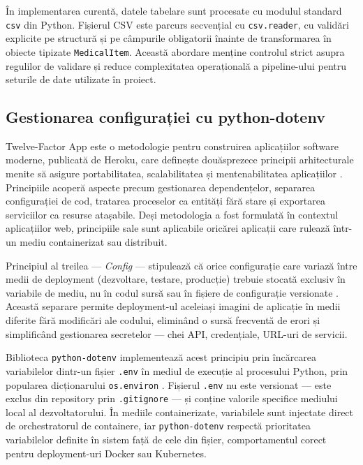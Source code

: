 \documentclass[12pt, a4paper, oneside, romanian]{teza-upb}
\begin{document}
În implementarea curentă, datele tabelare sunt procesate cu modulul standard
\texttt{csv} din Python. Fișierul CSV este parcurs secvențial cu \texttt{csv.reader}, cu
validări explicite pe structură și pe câmpurile obligatorii înainte de
transformarea în obiecte tipizate \texttt{MedicalItem}. Această abordare menține
controlul strict asupra regulilor de validare și reduce complexitatea
operațională a pipeline-ului pentru seturile de date utilizate în proiect.
\subsection{Gestionarea configurației cu python-dotenv}

Twelve-Factor App este o metodologie pentru construirea aplicațiilor software 
moderne, publicată de Heroku, care definește douăsprezece principii arhitecturale 
menite să asigure portabilitatea, scalabilitatea și mentenabilitatea aplicațiilor 
\cite{twelvefactor}. Principiile acoperă aspecte precum gestionarea dependențelor, 
separarea configurației de cod, tratarea proceselor ca entități fără stare și 
exportarea serviciilor ca resurse atașabile. Deși metodologia a fost formulată 
în contextul aplicațiilor web, principiile sale sunt aplicabile oricărei aplicații 
care rulează într-un mediu containerizat sau distribuit.

Principiul al treilea — \textit{Config} — stipulează că orice configurație care 
variază între medii de deployment (dezvoltare, testare, producție) trebuie stocată 
exclusiv în variabile de mediu, nu în codul sursă sau în fișiere de configurație 
versionate \cite{twelvefactor}. Această separare permite deployment-ul aceleiași 
imagini de aplicație în medii diferite fără modificări ale codului, eliminând 
o sursă frecventă de erori și simplificând gestionarea secretelor — chei API, 
credențiale, URL-uri de servicii.

Biblioteca \texttt{python-dotenv} implementează acest principiu prin încărcarea 
variabilelor dintr-un fișier \texttt{.env} în mediul de execuție al procesului 
Python, prin popularea dicționarului \texttt{os.environ} \cite{dotenv_doc}. 
Fișierul \texttt{.env} nu este versionat — este exclus din repository prin 
\texttt{.gitignore} — și conține valorile specifice mediului local al 
dezvoltatorului. În mediile containerizate, variabilele sunt injectate direct 
de orchestratorul de containere, iar \texttt{python-dotenv} respectă prioritatea 
variabilelor definite în sistem față de cele din fișier, comportamentul corect 
pentru deployment-uri Docker sau Kubernetes.
\end{document}
